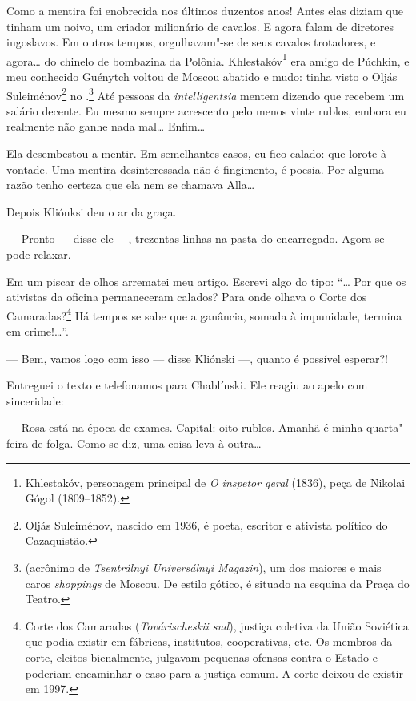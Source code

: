 Como a mentira foi enobrecida nos últimos duzentos anos! Antes elas
diziam que tinham um noivo, um criador milionário de cavalos. E agora
falam de diretores iugoslavos. Em outros tempos, orgulhavam"-se de seus
cavalos trotadores, e agora\ldots{} do chinelo de bombazina da Polônia.
Khlestakóv\footnote{Khlestakóv, personagem principal de \emph{O inspetor
  geral} (1836), peça de Nikolai Gógol (1809--1852).} era amigo
de Púchkin, e meu conhecido Guénytch voltou de Moscou abatido e mudo:
tinha visto o Oljás Suleiménov\footnote{Oljás Suleiménov, nascido em
  1936, é poeta, escritor e ativista político do Cazaquistão.} no
.\footnote{ (acrônimo de \emph{Tsentrálnyi Universálnyi
  Magazin}), um dos maiores e mais caros \emph{shoppings} de Moscou. De
  estilo gótico, é situado na esquina da Praça do Teatro.} Até pessoas
da \emph{intelligentsia} mentem dizendo que recebem um salário decente.
Eu mesmo sempre acrescento pelo menos vinte rublos, embora eu realmente
não ganhe nada mal\ldots{} Enfim\ldots{}

Ela desembestou a mentir. Em semelhantes casos, eu fico calado: que
lorote à vontade. Uma mentira desinteressada não é fingimento, é poesia.
Por alguma razão tenho certeza que ela nem se chamava Alla\ldots{}

Depois Kliónksi deu o ar da graça.

--- Pronto --- disse ele ---, trezentas linhas na pasta do encarregado.
Agora se pode relaxar.

Em um piscar de olhos arrematei meu artigo. Escrevi algo do tipo: ``\ldots{}
Por que os ativistas da oficina permaneceram calados? Para onde olhava o
Corte dos Camaradas?\footnote{Corte dos Camaradas (\emph{Továrischeskii
  sud}), justiça coletiva da União Soviética que podia existir em
  fábricas, institutos, cooperativas, etc. Os membros da corte, eleitos
  bienalmente, julgavam pequenas ofensas contra o Esta­do e poderiam
  encaminhar o caso para a justiça comum. A corte deixou de existir em
  1997.} Há tempos se sabe que a ganância, somada à impunidade, termina
em crime!\ldots{}''.

--- Bem, vamos logo com isso --- disse Kliónski ---, quanto é possível
esperar?!

Entreguei o texto e telefonamos para Chablínski. Ele reagiu ao apelo com
sinceridade:

--- Rosa está na época de exames. Capital: oito rublos. Amanhã é minha
quarta"-feira de folga. Como se diz, uma coisa leva à outra\ldots{}

